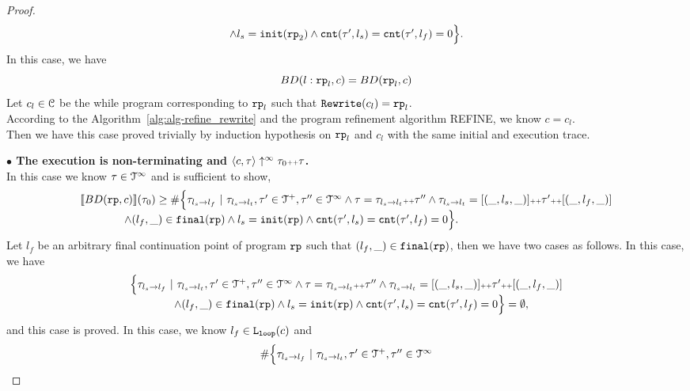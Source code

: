 \begin{proof}
\[\begin{array}{l}
    \land l_s = \mathtt{init}(\mathtt{rp}_2)
    \land \mathtt{cnt}(\mathtt{\tau}', l_s) = \mathtt{cnt}(\mathtt{\tau}', l_f) = 0 
    \Big\}.
    \end{array}
\]
In this case, we have
\[
  BD(l: \mathtt{rp}_l, c) = BD(\mathtt{rp}_l, c)
\]
Let $c_l \in \mathcal{C}$ be the while program corresponding to $\mathtt{rp}_l$ such that $\mathtt{Rewrite}(c_l) = \mathtt{rp}_l$.
\\
According to the Algorithm~\ref{alg:alg-refine_rewrite} and the program refinement algorithm REFINE, we know
$c = c_l$.
\\
Then we have this case proved trivially by induction hypothesis on $\mathtt{rp}_l$ and $c_l$ with the same initial and execution trace.

\textbf{$\bullet$ The execution is non-terminating and {$\langle {c}, \mathtt{\tau} \rangle \uparrow^{\infty} \mathtt{\tau}_0 {\scriptscriptstyle ++} \mathtt{\tau}$}.} 
\\
 In this case we know $\mathtt{\tau} \in \mathcal{T}^{\infty}$ and is sufficient to show,
 \[
  \begin{array}{l}
  \llbracket BD(\mathtt{rp}, c) \rrbracket(\mathtt{\tau}_0) \geq
  \# \Big\{\mathtt{\tau}_{l_s \to l_f} ~\vert~ \mathtt{\tau}_{l_s \to l_t}, \mathtt{\tau}'\in \mathcal{T}^{+}, \mathtt{\tau}''\in \mathcal{T}^{\infty}
  \land \mathtt{\tau} = \mathtt{\tau}_{l_s \to l_t} {\scriptscriptstyle ++} \mathtt{\tau}''
  \land \mathtt{\tau}_{l_s \to l_t} = [(\_, l_s, \_)] {\scriptscriptstyle ++} \mathtt{\tau}' {\scriptscriptstyle ++} [(\_, l_f, \_)]
\\ \qquad \qquad
  \land (l_{f}, \_) \in \mathtt{final}(\mathtt{rp})
  \land l_s = \mathtt{init}(\mathtt{rp})
  \land \mathtt{cnt}(\mathtt{\tau}', l_s) = \mathtt{cnt}(\mathtt{\tau}', l_f) = 0 
  \Big\}.
  \end{array}
\]
Let $l_f$ be an arbitrary final continuation point of program $\mathtt{rp}$ such that $(l_{f}, \_) \in \mathtt{final}(\mathtt{rp})$,
then we have two cases as follows.
In this case, we have 
\[
  \begin{array}{l}
  \Big\{\mathtt{\tau}_{l_s \to l_f} ~\vert~ \mathtt{\tau}_{l_s \to l_t}, \mathtt{\tau}'\in \mathcal{T}^{+}, \mathtt{\tau}''\in \mathcal{T}^{\infty}
    \land \mathtt{\tau} = \mathtt{\tau}_{l_s \to l_t} {\scriptscriptstyle ++} \mathtt{\tau}''
    \land \mathtt{\tau}_{l_s \to l_t} = [(\_, l_s, \_)] {\scriptscriptstyle ++} \mathtt{\tau}' {\scriptscriptstyle ++} [(\_, l_f, \_)]
    \\ \qquad \qquad
  \land (l_{f}, \_) \in \mathtt{final}(\mathtt{rp})
  \land l_s = \mathtt{init}(\mathtt{rp})
  \land \mathtt{cnt}(\mathtt{\tau}', l_s) = \mathtt{cnt}(\mathtt{\tau}', l_f) = 0 
  \Big\} = \emptyset,
  \end{array}
\]
and this case is proved.
In this case, we know $l_f \in \mathtt{L}_{\mathtt{loop}}(c)$ and 
\[
  \begin{array}{l}
    \# \Big\{\mathtt{\tau}_{l_s \to l_f} ~\vert~ \mathtt{\tau}_{l_s \to l_t}, \mathtt{\tau}'\in \mathcal{T}^{+}, \mathtt{\tau}''\in \mathcal{T}^{\infty}

\end{array}\]
\end{proof}
